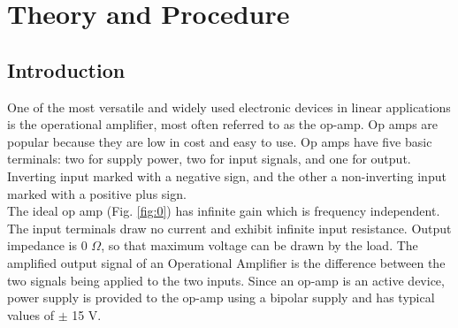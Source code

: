 \section{Theory and Procedure}






\subsection*{Introduction}

One of the most versatile and widely used electronic devices in linear applications is the operational amplifier, most often referred to as the op-amp. Op amps are popular because they are low in cost and easy to use. Op amps have five basic terminals: two for supply power, two for input signals, and one for output. Inverting input marked with a negative sign, and the other a non-inverting input marked with a positive plus sign.\\

The ideal op amp (Fig. \ref{fig:0}) has infinite gain which is frequency independent. The input terminals draw no current and exhibit infinite input resistance. Output impedance is 0 $\Omega$, so that maximum voltage can be drawn by the load.
The amplified output signal of an Operational Amplifier is the difference between the two signals being applied to the two inputs. Since an op-amp is an active device,  power supply is provided to the op-amp using a bipolar supply and has typical values of $\pm$ 15 V.\\

